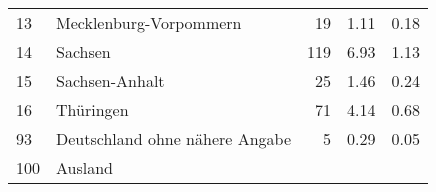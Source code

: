 \begin{longtable}{lXrrr}
     13 &
     \multicolumn{1}{X}{ Mecklenburg-Vorpommern   } &


       \num{19} &
       \num[round-mode=places,round-precision=2]{1.11} &
         \num[round-mode=places,round-precision=2]{0.18} \\

     14 &
     \multicolumn{1}{X}{ Sachsen   } &


       \num{119} &
       \num[round-mode=places,round-precision=2]{6.93} &
         \num[round-mode=places,round-precision=2]{1.13} \\

     15 &
     \multicolumn{1}{X}{ Sachsen-Anhalt   } &


       \num{25} &
       \num[round-mode=places,round-precision=2]{1.46} &
         \num[round-mode=places,round-precision=2]{0.24} \\

     16 &
     \multicolumn{1}{X}{ Thüringen   } &


       \num{71} &
       \num[round-mode=places,round-precision=2]{4.14} &
         \num[round-mode=places,round-precision=2]{0.68} \\

     93 &
     \multicolumn{1}{X}{ Deutschland ohne nähere Angabe   } &


       \num{5} &
       \num[round-mode=places,round-precision=2]{0.29} &
         \num[round-mode=places,round-precision=2]{0.05} \\

     100 &
     \multicolumn{1}{X}{ Ausland   } &



\end{longtable}
